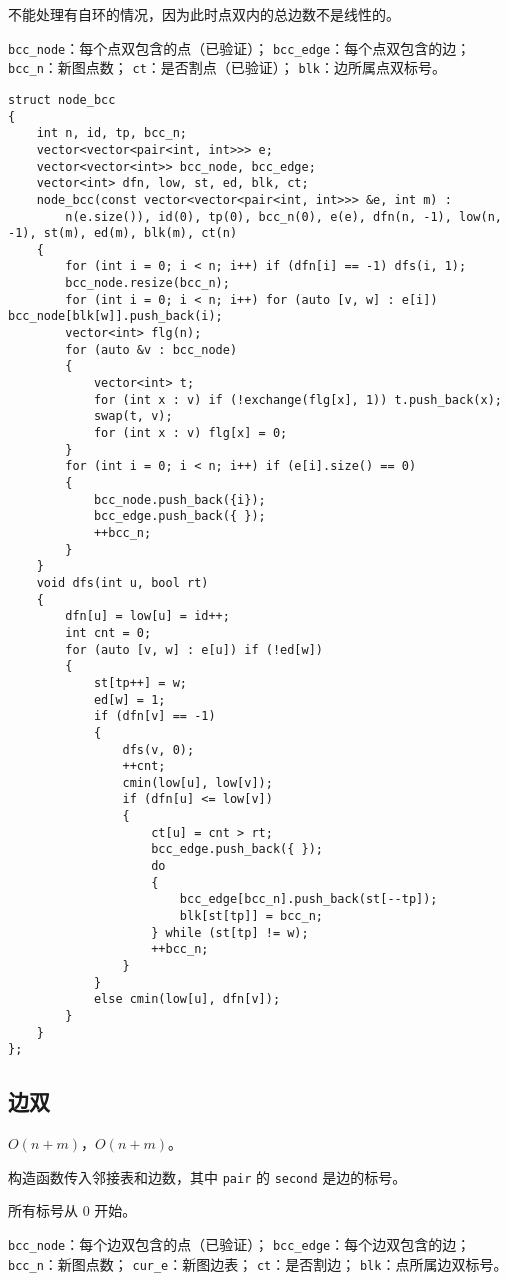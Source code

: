 \documentclass[12pt]{ctexart}
\begin{document}
不能处理有自环的情况，因为此时点双内的总边数不是线性的。

\verb|bcc_node|：每个点双包含的点（已验证）；
\verb|bcc_edge|：每个点双包含的边；
\verb|bcc_n|：新图点数；
\verb|ct|：是否割点（已验证）；
\verb|blk|：边所属点双标号。

\begin{lstlisting}
struct node_bcc
{
	int n, id, tp, bcc_n;
	vector<vector<pair<int, int>>> e;
	vector<vector<int>> bcc_node, bcc_edge;
	vector<int> dfn, low, st, ed, blk, ct;
	node_bcc(const vector<vector<pair<int, int>>> &e, int m) :
		n(e.size()), id(0), tp(0), bcc_n(0), e(e), dfn(n, -1), low(n, -1), st(m), ed(m), blk(m), ct(n)
	{
		for (int i = 0; i < n; i++) if (dfn[i] == -1) dfs(i, 1);
		bcc_node.resize(bcc_n);
		for (int i = 0; i < n; i++) for (auto [v, w] : e[i]) bcc_node[blk[w]].push_back(i);
		vector<int> flg(n);
		for (auto &v : bcc_node)
		{
			vector<int> t;
			for (int x : v) if (!exchange(flg[x], 1)) t.push_back(x);
			swap(t, v);
			for (int x : v) flg[x] = 0;
		}
		for (int i = 0; i < n; i++) if (e[i].size() == 0)
		{
			bcc_node.push_back({i});
			bcc_edge.push_back({ });
			++bcc_n;
		}
	}
	void dfs(int u, bool rt)
	{
		dfn[u] = low[u] = id++;
		int cnt = 0;
		for (auto [v, w] : e[u]) if (!ed[w])
		{
			st[tp++] = w;
			ed[w] = 1;
			if (dfn[v] == -1)
			{
				dfs(v, 0);
				++cnt;
				cmin(low[u], low[v]);
				if (dfn[u] <= low[v])
				{
					ct[u] = cnt > rt;
					bcc_edge.push_back({ });
					do
					{
						bcc_edge[bcc_n].push_back(st[--tp]);
						blk[st[tp]] = bcc_n;
					} while (st[tp] != w);
					++bcc_n;
				}
			}
			else cmin(low[u], dfn[v]);
		}
	}
};
\end{lstlisting}

\subsection{边双}

$O(n+m)$，$O(n+m)$。

构造函数传入邻接表和边数，其中 \verb|pair| 的 \verb|second| 是边的标号。

所有标号从 $0$ 开始。

\verb|bcc_node|：每个边双包含的点（已验证）；
\verb|bcc_edge|：每个边双包含的边；
\verb|bcc_n|：新图点数；
\verb|cur_e|：新图边表；
\verb|ct|：是否割边；
\verb|blk|：点所属边双标号。
\end{document}

